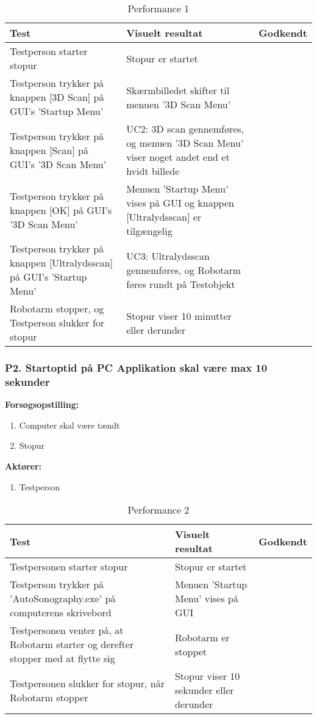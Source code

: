 \begin{table}[htb]
\begin{tabularx}{\textwidth}{|X|X|p{2cm}|}
\hline
\textbf{Test} & \textbf{Visuelt resultat} &\textbf{Godkendt}\\\hline  
Testperson starter stopur & Stopur er startet & \\\hline
Testperson trykker på knappen [3D Scan] på GUI's 'Startup Menu' & Skærmbilledet skifter til menuen '3D Scan Menu' &  \\\hline
Testperson trykker på knappen [Scan] på GUI's '3D Scan Menu' & UC2: 3D scan gennemføres, og menuen '3D Scan Menu' viser noget andet end et hvidt billede & \\\hline
Testperson trykker på knappen [OK] på GUI's '3D Scan Menu' & Menuen 'Startup Menu' vises på GUI og knappen [Ultralydsscan] er tilgængelig & \\\hline
Testperson trykker på knappen [Ultralydsscan] på GUI's 'Startup Menu' & UC3: Ultralydsscan gennemføres, og Robotarm føres rundt på Testobjekt & \\\hline
Robotarm stopper, og Testperson slukker for stopur & Stopur viser 10 minutter eller derunder & \\\hline
\end{tabularx} 
\caption{Performance 1}
\label{P1}
\end{table}
\newpage

\subsubsection{P2. Startoptid på PC Applikation skal være max 10 sekunder}
\textbf{Forsøgsopstilling:}
\begin{enumerate}
\item Computer skal være tændt
\item Stopur
\end{enumerate}
\textbf{Aktører:}
\begin{enumerate}
\item Testperson
\end{enumerate}

\begin{table}[htb]
\begin{tabularx}{\textwidth}{|X|X|p{2cm}|}
\hline
\textbf{Test} & \textbf{Visuelt resultat} &\textbf{Godkendt}\\\hline  
Testpersonen starter stopur & Stopur er startet & \\ \hline
Testperson trykker på 'AutoSonography.exe' på computerens skrivebord & Menuen 'Startup Menu' vises på GUI &\\\hline
Testpersonen venter på, at Robotarm starter og derefter stopper med at flytte sig & Robotarm er stoppet  & \\\hline
Testpersonen slukker for stopur, når Robotarm stopper & Stopur viser 10 sekunder eller derunder & \\ \hline
\end{tabularx} 
\caption{Performance 2}
\label{P2}
\end{table}
\newpage

